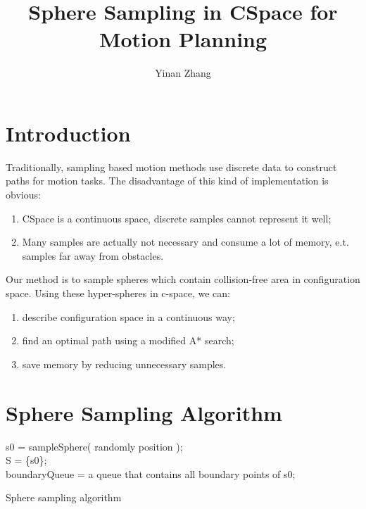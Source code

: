 \documentclass{article}
\title{Sphere Sampling in CSpace for Motion Planning}
\author{Yinan Zhang}
\begin{document}
\maketitle

\section{Introduction}

Traditionally, sampling based motion methods use discrete data to construct paths for motion tasks. The disadvantage of this kind of implementation is obvious: 

\begin{enumerate}
  \item CSpace is a continuous space, discrete samples cannot represent it well;
  \item Many samples are actually not necessary and consume a lot of memory, e.t. samples far away from obstacles.
\end{enumerate}

Our method is to sample spheres which contain collision-free area in configuration space. Using these hyper-spheres in c-space, we can:
\begin{enumerate}
  \item describe configuration space in a continuous way;
  \item find an optimal path using a modified A* search;
  \item save memory by reducing unnecessary samples.
\end{enumerate}

\section{Sphere Sampling Algorithm}
\label{Sphere sampling algorithm}
 \begin{algorithm}
 	s0 = sampleSphere( randomly position );\\
 	S = \{s0\}; \\
 	boundaryQueue = a queue that contains all boundary points of s0;\\
 	\caption{ Sphere sampling algorithm }
 \end{algorithm}
\end{document}
